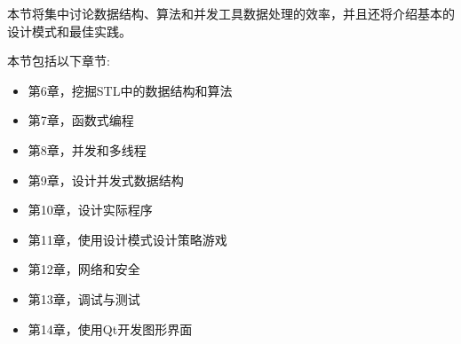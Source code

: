 本节将集中讨论数据结构、算法和并发工具数据处理的效率，并且还将介绍基本的设计模式和最佳实践。 \par

本节包括以下章节: \par

\begin{itemize}
	\item 第6章，挖掘STL中的数据结构和算法
	\item 第7章，函数式编程
	\item 第8章，并发和多线程
	\item 第9章，设计并发式数据结构
	\item 第10章，设计实际程序
	\item 第11章，使用设计模式设计策略游戏
	\item 第12章，网络和安全
	\item 第13章，调试与测试
	\item 第14章，使用Qt开发图形界面
\end{itemize}